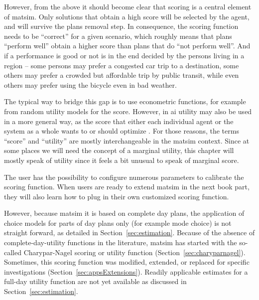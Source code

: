 However, from the above it should become clear that scoring is a central element of \gls{matsim}.  Only solutions that obtain a high score will be selected by the agent, and will survive the plans removal step.  In consequence, the scoring function needs to be ``correct'' for a given scenario, which roughly means that plans ``perform well'' obtain a higher score than plans that do ``not perform well''.  And if a performance is good or not is in the end decided by the persons living in a region -- some persons may prefer a congested car trip to a destination, some others may prefer a crowded but affordable trip by public transit, while even others may prefer using the bicycle even in bad weather.

The typical way to bridge this gap is to use econometric  functions, for example from random utility models \citep[e.g.][]{BenAkivaLerman_1985,Train_2003} for the score.  However, in \gls{ai} utility may also be used in a more general way, as the score that either each individual agent or the system as a whole wants to or should optimize \citep{RusselNorvig2010ArtificialIntelligence}.   For those reasons, the terms ``score'' and ``utility'' are mostly interchangeable in the \gls{matsim} context.  Since at some places we will need the concept of a marginal utility, this chapter will mostly speak of utility since it feels a bit unusual to speak of marginal score.

The user has the possibility to configure numerous parameters to calibrate the
scoring function.
When users are ready to extend \gls{matsim} in the next book part, they will also learn how to plug in their own customized scoring function.

However, because \gls{matsim} it is based on complete day plans, the application of choice models for parts of day plans only (for example mode choice) is not straight forward, as detailed in Section~\ref{sec:estimation}.
%
%
Because of the absence of complete-day-utility functions in the literature, \gls{matsim} has
started with the so-called Charypar-Nagel scoring or \gls{utility} function (Section~\ref{sec:charyparnagel}).  Sometimes, this scoring function was modified, extended, or replaced for specific investigations (Section~\ref{sec:appsExtensions}). Readily applicable estimates for a full-day utility function are not yet available as discussed in Section~\ref{sec:estimation}.

